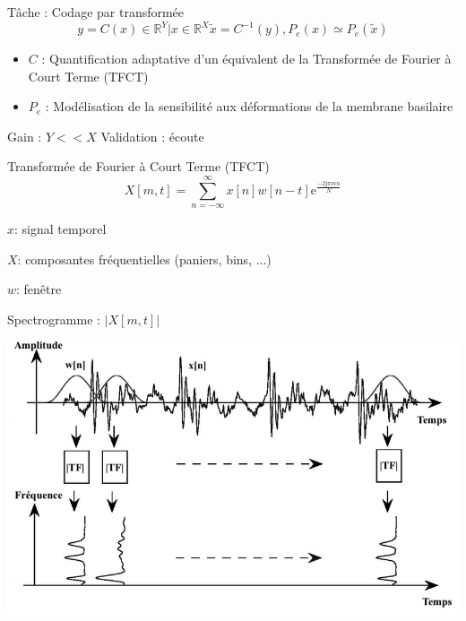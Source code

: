 \begin{frame}{\alert{Tâche} : Codage par transformée}
$$y = C(x) \in \mathbb{R}^Y | x \in \mathbb{R}^{X} \tilde{x} = C^{-1}(y), P_e(x) \simeq P_e(\tilde{x})$$
\begin{itemize}
\item $C$ : Quantification adaptative d'un équivalent de la Transformée de Fourier à Court Terme (TFCT)
\item $P_e$ : Modélisation de la sensibilité aux déformations de la membrane basilaire
\end{itemize}
Gain : $Y<<X$
Validation : écoute
\end{frame}

\begin{frame}{Transformée de Fourier à Court Terme (TFCT)}
$$ X[m, t] = \sum_{n = - \infty}^{\infty} x[n] w[n-t] \mathrm{e}^{\frac{-2 \mathrm{j}  \pi m n}{N}} $$
\begin{description}
\item $x$: signal temporel
\item $X$: composantes fréquentielles (paniers, bins, ...)
\item $w$: fenêtre
\end{description}
\end{frame}

\begin{frame}{Spectrogramme : $|X[m, t]|$}
\begin{center}
\includegraphics[width=.8\columnwidth]{figures/tfct} \\
\end{center}
\end{frame}

